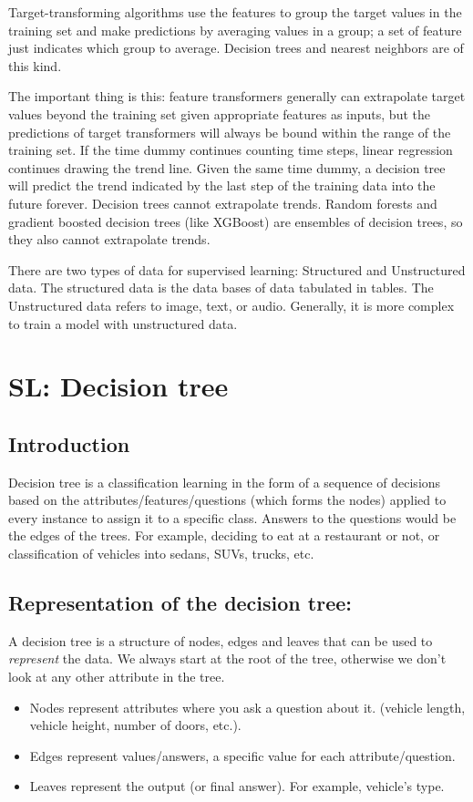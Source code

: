 \documentclass[12pt]{report}
\begin{document}
Target-transforming algorithms use the features to group the target values in the training set and make predictions by averaging values in a group; a set of feature just indicates which group to average. Decision trees and nearest neighbors are of this kind.

The important thing is this: feature transformers generally can extrapolate target values beyond the training set given appropriate features as inputs, but the predictions of target transformers will always be bound within the range of the training set. If the time dummy continues counting time steps, linear regression continues drawing the trend line. Given the same time dummy, a decision tree will predict the trend indicated by the last step of the training data into the future forever. Decision trees cannot extrapolate trends. Random forests and gradient boosted decision trees (like XGBoost) are ensembles of decision trees, so they also cannot extrapolate trends.

There are two types of data for supervised learning: Structured and Unstructured data. The structured data is the data bases of data tabulated in tables. The Unstructured data refers to image, text, or audio. Generally, it is more complex to train a model with unstructured data.

\section{SL: Decision tree}

\subsection{Introduction}

Decision tree is a classification learning in the form of a sequence of decisions based on the attributes/features/questions (which forms the nodes) applied to every instance to assign it to a specific class. Answers to the questions would be the edges of the trees.
For example, deciding to eat at a restaurant or not, or classification of vehicles into sedans, SUVs, trucks, etc.

\subsection{Representation of the decision tree:}

A decision tree is a structure of nodes, edges and leaves that can be used to \textit{represent} the data. We always start at the root of the tree, otherwise we don't look at any other attribute in the tree.
\begin{itemize}
\item Nodes represent attributes where you ask a question about it. (vehicle length, vehicle height, number of doors, etc.).
\item Edges represent values/answers, a specific value for each attribute/question.
\item Leaves represent the output (or final answer). For example, vehicle’s type.
\end{itemize}
\end{document}
